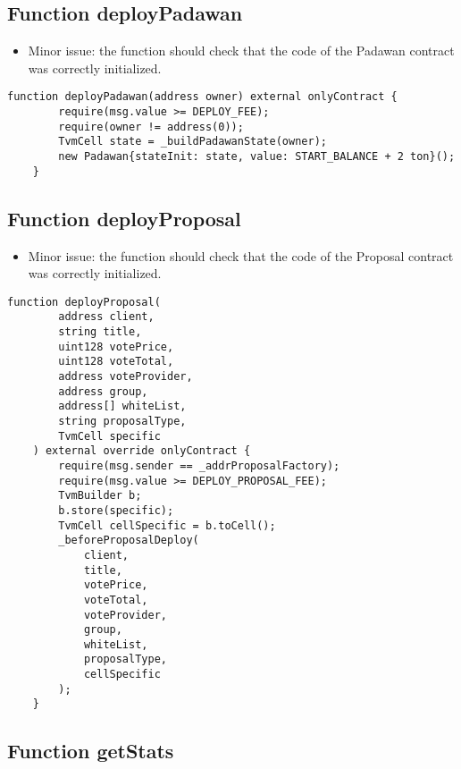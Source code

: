 \subsection{Function deployPadawan}

\begin{itemize}
\item Minor issue: the function should check that the code of the
  Padawan contract was correctly initialized.
\end{itemize}

\begin{lstlisting}[firstnumber=134]
    function deployPadawan(address owner) external onlyContract {
        require(msg.value >= DEPLOY_FEE);
        require(owner != address(0));
        TvmCell state = _buildPadawanState(owner);
        new Padawan{stateInit: state, value: START_BALANCE + 2 ton}();
    }
\end{lstlisting}

\subsection{Function deployProposal}

\begin{itemize}
\item Minor issue: the function should check that the code of the
  Proposal contract was correctly initialized.
\end{itemize}

\begin{lstlisting}[firstnumber=143]
    function deployProposal(
        address client,
        string title,
        uint128 votePrice,
        uint128 voteTotal,
        address voteProvider,
        address group,
        address[] whiteList,
        string proposalType,
        TvmCell specific
    ) external override onlyContract {
        require(msg.sender == _addrProposalFactory);
        require(msg.value >= DEPLOY_PROPOSAL_FEE);
        TvmBuilder b;
        b.store(specific);
        TvmCell cellSpecific = b.toCell();
        _beforeProposalDeploy(
            client,
            title,
            votePrice,
            voteTotal,
            voteProvider,
            group,
            whiteList,
            proposalType,
            cellSpecific
        );
    }
\end{lstlisting}

\subsection{Function getStats}

